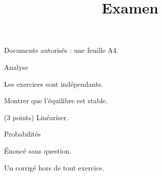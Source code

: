 \documentclass{ocots-exam}
\title{Examen}
\begin{document}
\maketitle
\begin{instructions}
    \item Documents autorisés : une feuille A4.
\end{instructions}
\begin{docpart}\label{partie:analyse}
    Analyse

    Les exercices sont indépendants.
    \begin{exercise}[label=ex:stab, points=8]
        \begin{question}
            Montrer que l'équilibre est stable.
        \end{question}
        \begin{correction}
            (3 points) Linéariser.
        \end{correction}
    \end{exercise}
\end{docpart}
\begin{docpart}
    Probabilités
\end{docpart}
\begin{exercise}[points=4]
    Énoncé sans question.
\end{exercise}
\begin{correction}
    Un corrigé hors de tout exercice.
\end{correction}
\end{document}
